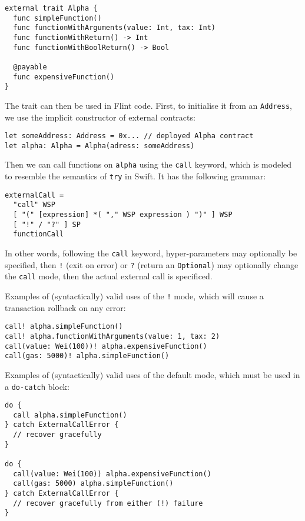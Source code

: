 \begin{verbatim}
external trait Alpha {
  func simpleFunction()
  func functionWithArguments(value: Int, tax: Int)
  func functionWithReturn() -> Int
  func functionWithBoolReturn() -> Bool
  
  @payable
  func expensiveFunction()
}
\end{verbatim}

The trait can then be used in Flint code. First, to initialise it from an 
\texttt{Address}, we use the implicit constructor of external contracts:

\begin{verbatim}
let someAddress: Address = 0x... // deployed Alpha contract
let alpha: Alpha = Alpha(adress: someAddress)
\end{verbatim}

Then we can call functions on \texttt{alpha} using the \texttt{call} keyword, which is modeled to resemble the semantics of \texttt{try} in Swift. It has the following grammar:

\begin{verbatim}
externalCall =
  "call" WSP
  [ "(" [expression] *( "," WSP expression ) ")" ] WSP
  [ "!" / "?" ] SP
  functionCall
\end{verbatim}

In other words, following the \texttt{call} keyword, hyper-parameters may optionally be specified, then \texttt{!} (exit on error) or \texttt{?} (return an \texttt{Optional}) may optionally change the \texttt{call} mode, then the actual external call is specificed.

Examples of (syntactically) valid uses of the \texttt{!} mode, which will cause a transaction rollback on any error:

\begin{verbatim}
call! alpha.simpleFunction()
call! alpha.functionWithArguments(value: 1, tax: 2)
call(value: Wei(100))! alpha.expensiveFunction()
call(gas: 5000)! alpha.simpleFunction()
\end{verbatim}

Examples of (syntactically) valid uses of the default mode, which must be used in a \texttt{do-catch} block:

\begin{verbatim}
do {
  call alpha.simpleFunction()
} catch ExternalCallError {
  // recover gracefully
}

do {
  call(value: Wei(100)) alpha.expensiveFunction()
  call(gas: 5000) alpha.simpleFunction()
} catch ExternalCallError {
  // recover gracefully from either (!) failure
}
\end{verbatim}

